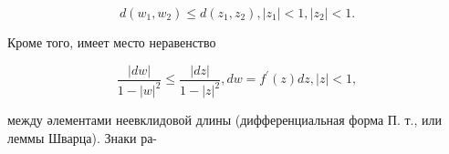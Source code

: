 \documentclass[10pt]{article}
\begin{document}
\[

d\left(w_{1}, w_{2}\right) \leqslant d\left(z_{1}, z_{2}\right),\left|z_{1}\right|<1,\left|z_{2}\right|<1 .

\]



Кроме того, имеет место неравенство



\[

\frac{|d w|}{1-|w|^{2}} \leqslant \frac{|d z|}{1-|z|^{2}}, d w=f^{\prime}(z) d z,|z|<1,

\]



между әлементами неевклидовой длины (дифференциальная форма П. т., или леммы Шварца). Знаки ра-
\end{document}
